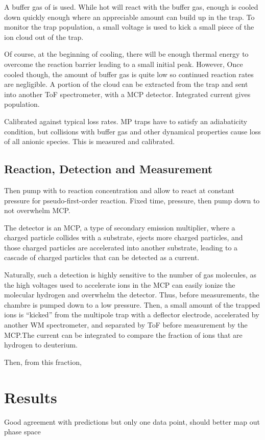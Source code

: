 \documentclass[12pt]{article}
\begin{document}
A buffer gas of  is used. While hot  will react with the  buffer gas, enough is cooled down quickly enough where an appreciable amount can build up in the trap. To monitor the trap population, a small voltage is used to kick a small piece of the ion cloud out of the trap.

Of course, at the beginning of cooling, there will be enough thermal energy to overcome the reaction barrier leading to a small initial  peak. However, Once cooled though, the amount of buffer gas is quite low so continued reaction rates are negligible. A portion of the cloud can be extracted from the trap and sent into another ToF spectrometer, with a MCP detector. Integrated current gives population.

Calibrated against typical loss rates. MP traps have to satisfy an adiabaticity condition, but collisions with buffer gas and other dynamical properties cause loss of all anionic species. This is measured and calibrated.


\subsection{Reaction, Detection and Measurement}
Then pump with  to reaction concentration and allow to react at constant pressure for pseudo-first-order reaction. Fixed time, pressure, then pump down to not overwhelm MCP.\@

The detector is an MCP, a type of secondary emission multiplier, where a charged particle collides with a substrate, ejects more charged particles, and those charged particles are accelerated into another substrate, leading to a cascade of charged particles that can be detected as a current.

Naturally, such a detection is highly sensitive to the number of gas molecules, as the high voltages used to accelerate ions in the MCP can easily ionize the molecular hydrogen and overwhelm the detector. Thus, before measurements, the chambre is pumped down to a low  pressure. Then, a small amount of the trapped ions is ``kicked'' from the multipole trap with a deflector electrode, accelerated by another WM spectrometer, and separated by ToF before measurement by the MCP.\@ The current can be integrated to compare the fraction of ions that are hydrogen to deuterium. 

Then, from this fraction, 

\section{Results}
Good agreement with predictions but only one data point, should better map out phase space
\newpage
\end{document}
